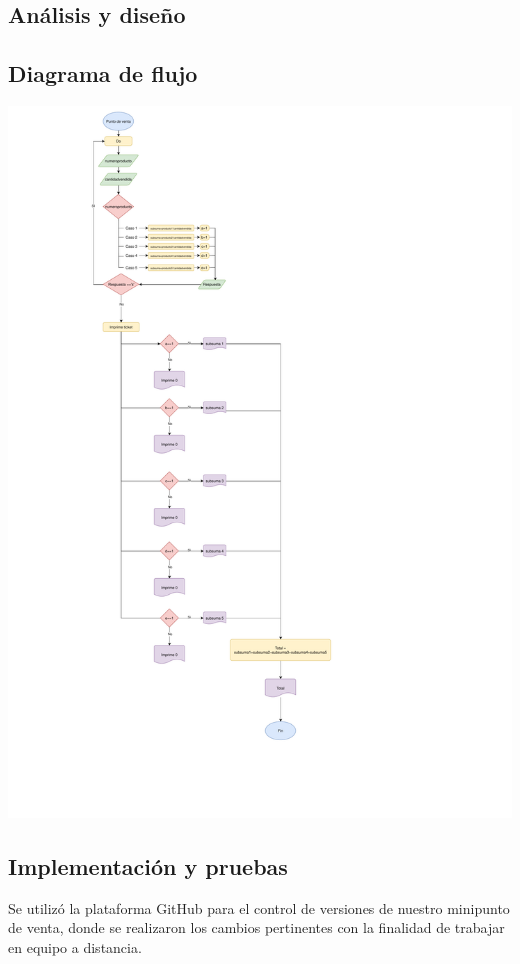 \documentclass{article}
\begin{document}
\begin{center}
\section{Análisis y diseño}
\subsection{Diagrama de flujo}
\begin{center}
 	\includegraphics[scale=0.35]{Images/Diagrama-eps-converted-to.pdf}
 	\label{figura4}
 \end{center}
\end{center}

\clearpage
\newpage

\begin{center}

\section{Implementación y pruebas}
\end{center}
    Se utilizó la plataforma GitHub para el control de versiones de nuestro minipunto de venta, donde se realizaron los cambios pertinentes con la finalidad de trabajar en equipo a distancia.\\
    
\end{document}
